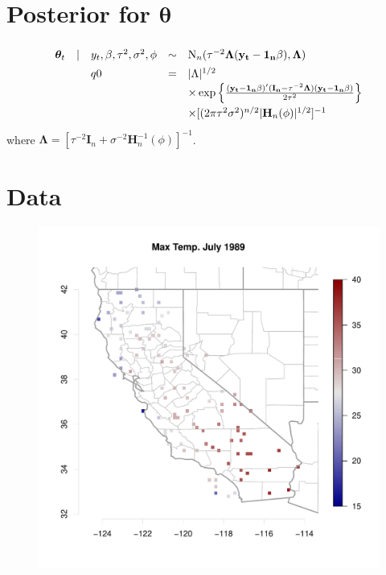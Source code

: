 \documentclass{article}
\def\beginmyfig{\begin{figure}[h]\center}
\def\endmyfig{\end{figure}}
\newcommand{\m}[1]{\mathbf{\bm{#1}}} %
\begin{document}
\section{Posterior for $\m\theta$}
\def\mm{\m{y_t}-\m{1_n}\beta}
\[\def\arraystretch{1.4}
  \begin{array}{rllcl}
    \m\theta_t &|& y_t,\beta,\tau^2,\sigma^2,\phi &\sim& \text{N}_n(\tau^{-2}\m\Lambda(\mm), \m\Lambda)\\
               && q0 &=& |\Lambda|^{1/2} \\
               &&&& \times \exp\left\{\frac{(\mm)'(\m{I_n}-\tau^{-2}\m\Lambda)(\mm)}{2\tau^2}\right\}\\
               &&&& \times [(2\pi\tau^2\sigma^2)^{n/2} |\m H_n(\phi)|^{1/2}]^{-1}\\
  \end{array}
\]
where $\m\Lambda = [\tau^{-2}\m I_n + \sigma^{-2} \m H_n^{-1}(\phi)]^{-1}$.


\section{Data}
\beginmyfig \includegraphics[scale=.5]{../graphs/july1989.pdf} \endmyfig
\end{document}
